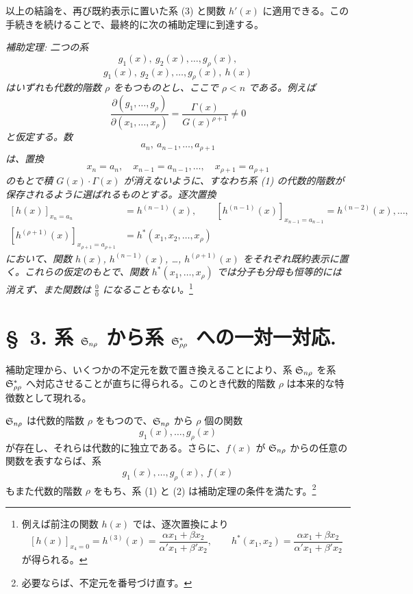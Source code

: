 \documentclass[11pt]{article}
\begin{document}
以上の結論を、再び既約表示に置いた系 (3) と関数 $h'(x)$ に適用できる。この手続きを続けることで、最終的に次の補助定理に到達する。

\emph{補助定理: 二つの系}
\[
  g_1(x),\ g_2(x),\ldots,g_\rho(x),
\]
\[
  g_1(x),\ g_2(x),\ldots,g_\rho(x),\ h(x)
\]
\emph{はいずれも代数的階数 $\rho$ をもつものとし、ここで $\rho<n$ である。例えば}
\[
 \frac{\partial(g_1,\ldots,g_\rho)}{\partial(x_1,\ldots,x_\rho)}
 =\frac{\Gamma(x)}{G(x)^{\rho+1}}\ne0
\]
\emph{と仮定する。数}
\[
  a_n,\ a_{n-1},\ldots,a_{\rho+1}
\]
\emph{は、置換}
\[
  x_n=a_n,\quad x_{n-1}=a_{n-1},\ldots,\quad x_{\rho+1}=a_{\rho+1}
\]
\emph{のもとで積 $G(x)\cdot\Gamma(x)$ が消えないように、すなわち系 (1) の代数的階数が保存されるように選ばれるものとする。逐次置換}
\[
\begin{aligned}
 [h(x)]_{x_n=a_n}&=h^{(n-1)}(x),\qquad
 [h^{(n-1)}(x)]_{x_{n-1}=a_{n-1}}=h^{(n-2)}(x),\ldots,\\
 [h^{(\rho+1)}(x)]_{x_{\rho+1}=a_{\rho+1}}&=h^*(x_1,x_2,\ldots,x_\rho)
\end{aligned}
\]
\emph{において、関数 $h(x)$, $h^{(n-1)}(x)$, \ldots, $h^{(\rho+1)}(x)$ をそれぞれ既約表示に置く。これらの仮定のもとで、関数 $h^*(x_1,\ldots,x_\rho)$ では分子も分母も恒等的には消えず、また関数は $\frac{0}{0}$ になることもない。}\footnote{例えば前注の関数 $h(x)$ では、逐次置換により
\[
 [h(x)]_{x_4=0}=h^{(3)}(x)=\frac{\alpha x_1+\beta x_2}{\alpha' x_1+\beta' x_2},\qquad
 h^*(x_1,x_2)=\frac{\alpha x_1+\beta x_2}{\alpha' x_1+\beta' x_2}
\]
が得られる。}

\section*{\S\ 3. 系 $\mathfrak{S}_{n\rho}$ から系 $\mathfrak{S}^*_{\rho\rho}$ への一対一対応.}

補助定理から、いくつかの不定元を数で置き換えることにより、系 $\mathfrak{S}_{n\rho}$ を系 $\mathfrak{S}^*_{\rho\rho}$ へ対応させることが直ちに得られる。このとき代数的階数 $\rho$ は本来的な特徴数として現れる。

$\mathfrak{S}_{n\rho}$ は代数的階数 $\rho$ をもつので、$\mathfrak{S}_{n\rho}$ から $\rho$ 個の関数
\begin{equation}
  g_1(x),\ldots,g_\rho(x)
\tag{1}
\end{equation}
が存在し、それらは代数的に独立である。さらに、$f(x)$ が $\mathfrak{S}_{n\rho}$ からの任意の関数を表すならば、系
\begin{equation}
  g_1(x),\ldots,g_\rho(x),\ f(x)
\tag{2}
\end{equation}
もまた代数的階数 $\rho$ をもち、系 (1) と (2) は補助定理の条件を満たす。\footnote{必要ならば、不定元を番号づけ直す。}
\end{document}
